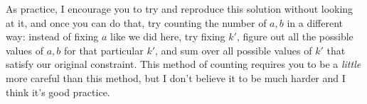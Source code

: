 \documentclass[10pt]{article}
\begin{document}
\begin{solution}
		As practice, I encourage you to try and reproduce this solution without looking at it, and once you can do that,
		try counting the number of \( a, b \) in a different way: instead of fixing \( a \) like we did here, try 
		fixing \( k' \), figure out all the possible values of  \( a, b \) for that particular \( k' \), and sum 
		over all possible values of \( k' \) that satisfy our original constraint. This method of counting 
		requires you to be a \textit{little} more careful than this method, but I don't believe it to be much harder
		and I think it's good practice. 
	\end{solution}
\end{document}
